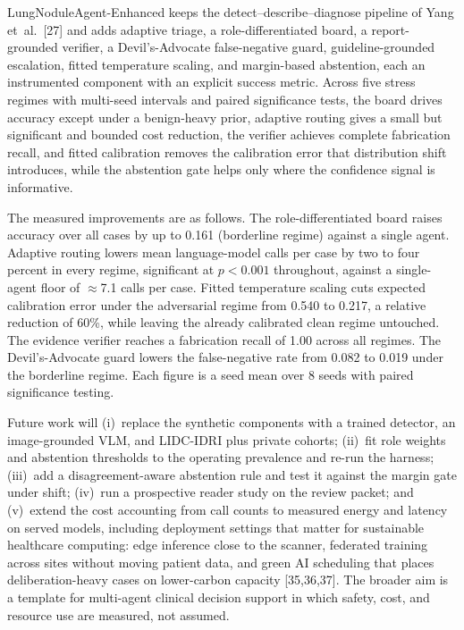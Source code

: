 \documentclass[12pt]{article}
\begin{document}
LungNoduleAgent-Enhanced keeps the detect--describe--diagnose pipeline of Yang et~al.~[27] and adds adaptive triage, a role-differentiated board, a report-grounded verifier, a Devil's-Advocate false-negative guard, guideline-grounded escalation, fitted temperature scaling, and margin-based abstention, each an instrumented component with an explicit success metric. Across five stress regimes with multi-seed intervals and paired significance tests, the board drives accuracy except under a benign-heavy prior, adaptive routing gives a small but significant and bounded cost reduction, the verifier achieves complete fabrication recall, and fitted calibration removes the calibration error that distribution shift introduces, while the abstention gate helps only where the confidence signal is informative.


The measured improvements are as follows. The role-differentiated board raises accuracy over all cases by up to 0.161 (borderline regime) against a single agent. Adaptive routing lowers mean language-model calls per case by two to four percent in every regime, significant at $p<0.001$ throughout, against a single-agent floor of $\approx$7.1 calls per case. Fitted temperature scaling cuts expected calibration error under the adversarial regime from 0.540 to 0.217, a relative reduction of 60\%, while leaving the already calibrated clean regime untouched. The evidence verifier reaches a fabrication recall of 1.00 across all regimes. The Devil's-Advocate guard lowers the false-negative rate from 0.082 to 0.019 under the borderline regime. Each figure is a seed mean over 8 seeds with paired significance testing.


Future work will (i)~replace the synthetic components with a trained detector, an image-grounded VLM, and LIDC-IDRI plus private cohorts; (ii)~fit role weights and abstention thresholds to the operating prevalence and re-run the harness; (iii)~add a disagreement-aware abstention rule and test it against the margin gate under shift; (iv)~run a prospective reader study on the review packet; and (v)~extend the cost accounting from call counts to measured energy and latency on served models, including deployment settings that matter for sustainable healthcare computing: edge inference close to the scanner, federated training across sites without moving patient data, and green AI scheduling that places deliberation-heavy cases on lower-carbon capacity [35,36,37]. The broader aim is a template for multi-agent clinical decision support in which safety, cost, and resource use are measured, not assumed.
\end{document}
